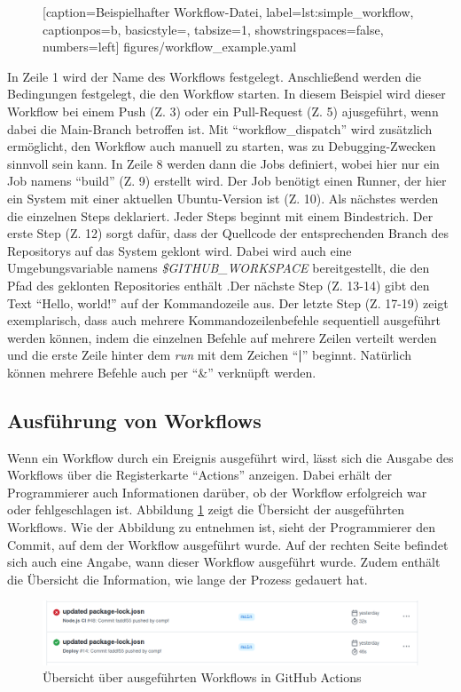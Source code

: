 \begin{figure}[h!]
	
			[caption={Beispielhafter Workflow-Datei},
			label={lst:simple_workflow},
			captionpos=b, basicstyle=\footnotesize, tabsize=1, showstringspaces=false,  numbers=left]
			{figures/workflow_example.yaml}
			\end{figure}
In Zeile 1 wird der Name des Workflows festgelegt. Anschließend werden die Bedingungen festgelegt, die den Workflow starten. In diesem Beispiel wird dieser Workflow bei einem Push (Z. 3) oder ein Pull-Request (Z. 5) ajusgeführt, wenn dabei die Main-Branch betroffen ist. Mit \enquote{workflow\_dispatch} wird zusätzlich ermöglicht, den Workflow auch manuell zu starten, was zu Debugging-Zwecken sinnvoll sein kann. In Zeile 8 werden dann die Jobs definiert, wobei hier nur ein Job namens \enquote{build} (Z. 9) erstellt wird. Der Job benötigt einen Runner, der hier ein System mit einer aktuellen Ubuntu-Version ist (Z. 10). Als nächstes werden die einzelnen Steps deklariert. Jeder Steps beginnt mit einem Bindestrich. Der erste Step (Z. 12) sorgt dafür, dass der Quellcode der entsprechenden Branch des Repositorys auf das System geklont wird. Dabei wird auch eine Umgebungsvariable namens \textit{\$GITHUB\_WORKSPACE} bereitgestellt, die den Pfad des geklonten Repositories enthält .Der nächste Step (Z. 13-14) gibt den Text \enquote{Hello, world!} auf der Kommandozeile aus. Der letzte Step (Z. 17-19) zeigt exemplarisch, dass auch mehrere Kommandozeilenbefehle sequentiell ausgeführt  werden können, indem die einzelnen Befehle auf  mehrere Zeilen verteilt werden und die erste Zeile hinter dem \textit{run} mit dem Zeichen \enquote{\textbf{|}} beginnt. Natürlich können mehrere Befehle auch per \enquote{\&} verknüpft werden. 
	\subsection{Ausführung von Workflows}
	Wenn ein Workflow durch ein Ereignis ausgeführt wird, lässt sich die Ausgabe des Workflows über die Registerkarte \enquote{Actions} anzeigen. Dabei erhält der Programmierer auch Informationen darüber, ob der Workflow erfolgreich war oder fehlgeschlagen ist. Abbildung \ref{fig:workflow_overview} zeigt die Übersicht der ausgeführten Workflows. Wie der Abbildung zu entnehmen ist, sieht der Programmierer den Commit, auf dem der Workflow ausgeführt wurde. Auf der rechten Seite befindet sich auch eine Angabe, wann dieser Workflow ausgeführt wurde. Zudem enthält die Übersicht die Information, wie lange der Prozess gedauert hat. 
	\begin{figure}[h]
	    \centering
	    
	    \includegraphics[width=\columnwidth]{figures/workflow_overview.png}
	    \caption{Übersicht über ausgeführten Workflows in GitHub Actions}
	    \label{fig:workflow_overview}
	\end{figure}
	
